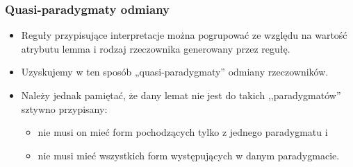 \documentclass{beamer}
\begin{document}
\begin{frame}
\frametitle{Quasi-paradygmaty odmiany}
\begin{itemize}
\item Reguły przypisujące interpretacje można pogrupować ze względu na wartość atrybutu lemma i rodzaj rzeczownika generowany przez regułę. 
\item Uzyskujemy w ten sposób „quasi-paradygmaty” odmiany rzeczowników.
\item Należy jednak pamiętać, że dany lemat nie jest do takich ,,paradygmatów'' sztywno przypisany:
\begin{itemize}
\item nie musi on mieć form pochodzących tylko z jednego paradygmatu i
\item nie musi mieć wszystkich form występujących w danym paradygmacie.
\end{itemize}
\end{itemize}
\end{frame}
\end{document}
